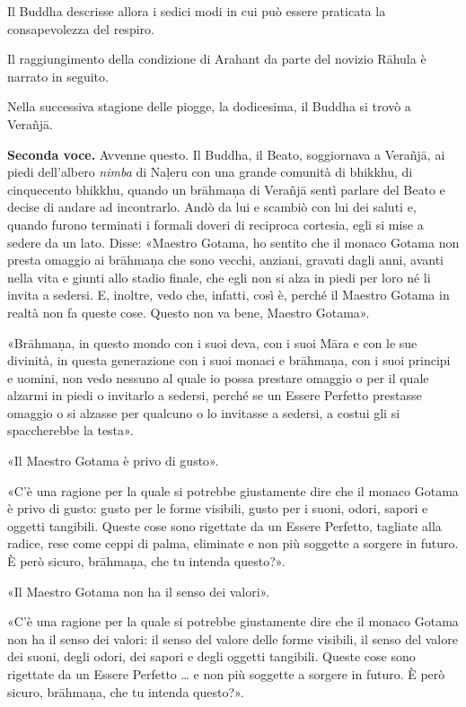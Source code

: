 

 Il Buddha descrisse allora i sedici modi in cui può
essere praticata la consapevolezza del respiro.


 Il raggiungimento della condizione di Arahant da parte
del novizio Rāhula è narrato in seguito.


 Nella successiva stagione delle piogge, la
dodicesima, il Buddha si trovò a Verañjā.


\label{pag137}\textbf{Seconda voce.} Avvenne questo. Il Buddha, il Beato, soggiornava a
Verañjā, ai piedi dell’albero \emph{nimba} di Naḷeru con una grande comunità
di bhikkhu, di cinquecento bhikkhu, quando un brāhmaṇa di Verañjā sentì
parlare del Beato e decise di andare ad incontrarlo. Andò da lui e
scambiò con lui dei saluti e, quando furono terminati i formali doveri
di reciproca cortesia, egli si mise a sedere da un lato. Disse: «Maestro
Gotama, ho sentito che il monaco Gotama non presta omaggio ai brāhmaṇa
che sono vecchi, anziani, gravati dagli anni, avanti nella vita e giunti
allo stadio finale, che egli non si alza in piedi per loro né li invita
a sedersi. E, inoltre, vedo che, infatti, così è, perché il Maestro
Gotama in realtà non fa queste cose. Questo non va bene, Maestro
Gotama».


«Brāhmaṇa, in questo mondo con i suoi deva, con i suoi Māra e con le sue
divinità, in questa generazione con i suoi monaci e brāhmaṇa, con i suoi
principi e uomini, non vedo nessuno al quale io possa prestare omaggio o
per il quale alzarmi in piedi o invitarlo a sedersi, perché se un Essere
Perfetto prestasse omaggio o si alzasse per qualcuno o lo invitasse a
sedersi, a costui gli si spaccherebbe la testa».


«Il Maestro Gotama è privo di gusto».


«C’è una ragione per la quale si potrebbe giustamente dire che il monaco
Gotama è privo di gusto: gusto per le forme visibili, gusto per i suoni,
odori, sapori e oggetti tangibili. Queste cose sono rigettate da un
Essere Perfetto, tagliate alla radice, rese come ceppi di palma,
eliminate e non più soggette a sorgere in futuro. È però sicuro,
brāhmaṇa, che tu intenda questo?».


«Il Maestro Gotama non ha il senso dei valori».


«C’è una ragione per la quale si potrebbe giustamente dire che il monaco
Gotama non ha il senso dei valori: il senso del valore delle forme
visibili, il senso del valore dei suoni, degli odori, dei sapori e degli
oggetti tangibili. Queste cose sono rigettate da un Essere Perfetto … e
non più soggette a sorgere in futuro. È però sicuro, brāhmaṇa, che tu
intenda questo?».


